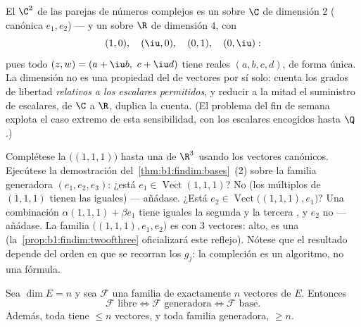 \begin{example}
\label{ex:b1:findim:twodimensions}
El  $\C^2$ de las parejas de números complejos es un
 sobre $\C$ de dimensión $2$ ( canónica
$e_1, e_2$) --- y un  sobre $\R$ de dimensión $4$,
con 
\[
(1, 0),\quad (\iu, 0),\quad (0, 1),\quad (0, \iu):
\]
pues todo $(z, w) = (a + \iu b,\ c + \iu d)$ tiene  reales
$(a, b, c, d)$, de forma única. La dimensión no es una propiedad del
 de vectores por sí solo: cuenta los grados de libertad
\emph{relativos a los escalares permitidos}, y reducir a la mitad el
suministro de escalares, de $\C$ a $\R$, duplica la cuenta. (El
problema del fin de semana explota el caso extremo de esta
sensibilidad, con los escalares encogidos hasta $\Q$.)
\end{example}

\begin{example}
\label{ex:b1:findim:completion}
Complétese la  $\bigl((1,1,1)\bigr)$ hasta una  de
$\R^3$ usando los vectores canónicos. Ejecútese la demostración
del~\cref{thm:b1:findim:bases}~(2) sobre la familia generadora
$(e_1, e_2, e_3)$: ¿está $e_1 \in \operatorname{Vect}(1,1,1)$? No
(los múltiplos de $(1,1,1)$ tienen las  iguales) ---
añádase. ¿Está $e_2 \in \operatorname{Vect}\bigl((1,1,1),
e_1\bigr)$? Una combinación $\alpha(1,1,1) + \beta e_1$ tiene iguales
la segunda y la tercera , y $e_2$ no --- añádase. La
familia $\bigl((1,1,1), e_1, e_2\bigr)$ es  con $3$ vectores:
alto, es una  (la~\cref{prop:b1:findim:twoofthree} oficializará
este reflejo). Nótese que el resultado depende del orden en que se
recorran los $g_j$: la compleción es un algoritmo, no una fórmula.
\end{example}

\begin{proposition}\label{prop:b1:findim:twoofthree}
Sea $\dim E = n$ y sea $\mathcal{F}$ una familia de exactamente $n$
vectores de $E$. Entonces
\[
\mathcal{F} \text{ libre} \iff \mathcal{F} \text{ generadora} \iff
\mathcal{F} \text{ base}.
\]
Además, toda  tiene $\leq n$ vectores, y toda familia
generadora, $\geq n$.
\end{proposition}

